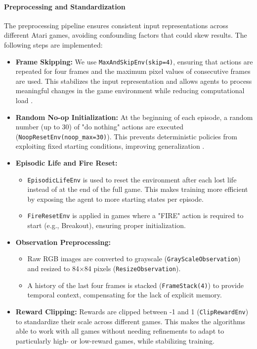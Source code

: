 \paragraph{Preprocessing and Standardization}
The preprocessing pipeline ensures consistent input representations across different Atari games, avoiding confounding factors that could skew results. The following steps are implemented:

\begin{itemize}
	\item \textbf{Frame Skipping:} We use \texttt{MaxAndSkipEnv(skip=4)}, ensuring that actions are repeated for four frames and the maximum pixel values of consecutive frames are used. This stabilizes the input representation and allows agents to process meaningful changes in the game environment while reducing computational load \cite{machado:revisiting_ale}.
	\item \textbf{Random No-op Initialization:} At the beginning of each episode, a random number (up to 30) of "do nothing" actions are executed (\texttt{NoopResetEnv(noop\_max=30)}). This prevents deterministic policies from exploiting fixed starting conditions, improving generalization \cite{machado:revisiting_ale}.
	\item \textbf{Episodic Life and Fire Reset:} 
	\begin{itemize}
		\item \texttt{EpisodicLifeEnv} is used to reset the environment after each lost life instead of at the end of the full game. This makes training more efficient by exposing the agent to more starting states per episode.
		\item \texttt{FireResetEnv} is applied in games where a "FIRE" action is required to start (e.g., Breakout), ensuring proper initialization.
	\end{itemize}
	\item \textbf{Observation Preprocessing:}
	\begin{itemize}
		\item Raw RGB images are converted to grayscale (\texttt{GrayScaleObservation}) and resized to 84×84 pixels (\texttt{ResizeObservation}).
		\item A history of the last four frames is stacked (\texttt{FrameStack(4)}) to provide temporal context, compensating for the lack of explicit memory.
	\end{itemize}
	\item \textbf{Reward Clipping:} Rewards are clipped between -1 and 1 (\texttt{ClipRewardEnv}) to standardize their scale across different games. This makes the algorithms able to work with all games without needing refinements to adapt to particularly high- or low-reward games, while stabilizing training.
\end{itemize}

